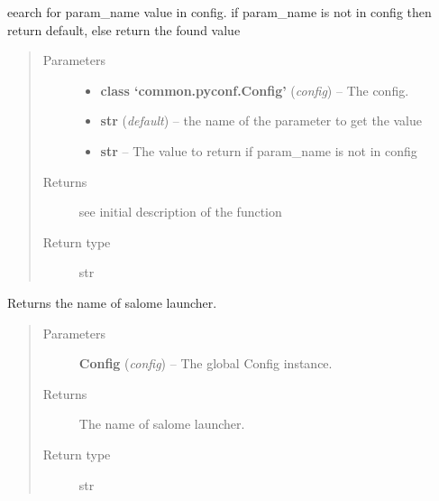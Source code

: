 \documentclass[a4paper,10pt,english]{sphinxmanual}
\begin{document}

\begin{fulllineitems}
\label{commands/apidoc/src:src.__init__.get_cfg_param}
eearch for param\_name value in config.
if param\_name is not in config 
then return default,
else return the found value
\begin{quote}\begin{description}
\item[{Parameters}] \leavevmode\begin{itemize}
\item {} 
\textbf{class `common.pyconf.Config'} (\emph{config}) -- The config.

\item {} 
\textbf{str} (\emph{default}) -- the name of the parameter to get the value

\item {} 
\textbf{str} -- The value to return if param\_name is not in config

\end{itemize}

\item[{Returns}] \leavevmode
see initial description of the function

\item[{Return type}] \leavevmode
str

\end{description}\end{quote}

\end{fulllineitems}


\begin{fulllineitems}
\label{commands/apidoc/src:src.__init__.get_launcher_name}
Returns the name of salome launcher.
\begin{quote}\begin{description}
\item[{Parameters}] \leavevmode
\textbf{Config} (\emph{config}) -- The global Config instance.

\item[{Returns}] \leavevmode
The name of salome launcher.

\item[{Return type}] \leavevmode
str

\end{description}\end{quote}

\end{fulllineitems}
\end{document}
